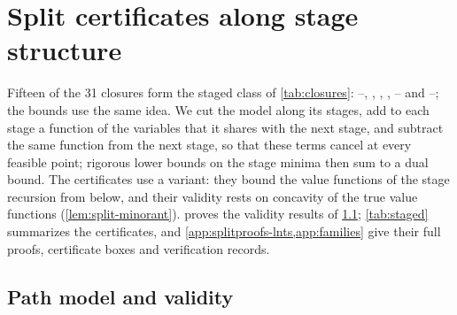 \section{Split certificates along stage structure}\label{sec:split}

Fifteen of the 31 closures form the staged class of \cref{tab:closures}: --, , , , -- and --; the  bounds use the same idea.
We cut the model along its stages, add to each stage a function of the variables that it shares with the next stage, and subtract the same function from the next stage, so that these terms cancel at every feasible point; rigorous lower bounds on the stage minima then sum to a dual bound.
The  certificates use a variant: they bound the value functions of the stage recursion from below, and their validity rests on concavity of the true value functions (\cref{lem:split-minorant}).
 proves the validity results of \cref{sec:split-framework}; \cref{tab:staged} summarizes the certificates, and \cref{app:splitproofs-lnts,app:families} give their full proofs, certificate boxes and verification records.

\subsection{Path model and validity}\label{sec:split-framework}

